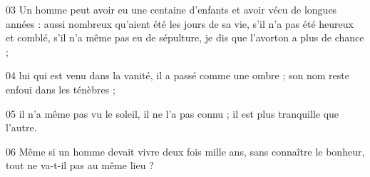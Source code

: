 
03 Un homme peut avoir eu une centaine d’enfants et avoir vécu de longues années : aussi nombreux qu’aient été les jours de sa vie, s’il n’a pas été heureux et comblé, s’il n’a même pas eu de sépulture, je dis que l’avorton a plus de chance ;

04 lui qui est venu dans la vanité, il a passé comme une ombre ; son nom reste enfoui dans les ténèbres ;

05 il n’a même pas vu le soleil, il ne l’a pas connu ; il est plus tranquille que l’autre.

06 Même si un homme devait vivre deux fois mille ans, sans connaître le bonheur, tout ne va-t-il pas au même lieu ?
